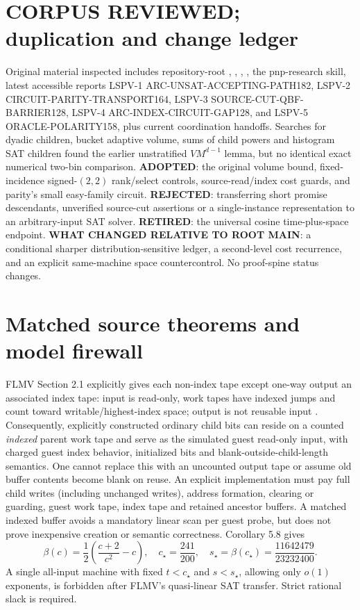 \documentclass[11pt]{article}
\begin{document}
\section{CORPUS REVIEWED; duplication and change ledger}
Original material inspected includes repository-root , , , , the pnp-research skill, latest accessible reports LSPV-1 ARC-UNSAT-ACCEPTING-PATH182, LSPV-2 CIRCUIT-PARITY-TRANSPORT164, LSPV-3 SOURCE-CUT-QBF-BARRIER128, LSPV-4 ARC-INDEX-CIRCUIT-GAP128, and LSPV-5 ORACLE-POLARITY158, plus current coordination handoffs. Searches for dyadic children, bucket adaptive volume, sums of child powers and histogram SAT children found the earlier unstratified $VM^{d-1}$ lemma, but no identical exact numerical two-bin comparison.
\textbf{ADOPTED}: the original volume bound, fixed-incidence signed-$(2,2)$ rank/select controls, source-read/index cost guards, and parity's small easy-family circuit. \textbf{REJECTED}: transferring short promise descendants, unverified source-cut assertions or a single-instance representation to an arbitrary-input SAT solver. \textbf{RETIRED}: the universal cosine time-plus-space endpoint. \textbf{WHAT CHANGED RELATIVE TO ROOT MAIN}: a conditional sharper distribution-sensitive ledger, a second-level cost recurrence, and an explicit same-machine space countercontrol. No proof-spine status changes.

\section{Matched source theorems and model firewall}
FLMV Section 2.1 explicitly gives each non-index tape except one-way output an associated index tape: input is read-only, work tapes have indexed jumps and count toward writable/highest-index space; output is not reusable input \cite{flmv}. Consequently, explicitly constructed ordinary child bits can reside on a counted \emph{indexed} parent work tape and serve as the simulated guest read-only input, with charged guest index behavior, initialized bits and blank-outside-child-length semantics. One cannot replace this with an uncounted output tape or assume old buffer contents become blank on reuse. An explicit implementation must pay full child writes (including unchanged writes), address formation, clearing or guarding, guest work tape, index tape and retained ancestor buffers. A matched indexed buffer avoids a mandatory linear scan per guest probe, but does not prove inexpensive creation or semantic correctness.
Corollary 5.8 gives
\[
\beta(c)=\frac12\left(\frac{c+2}{c^2}-c\right),\quad
c_\star=\frac{241}{200},\quad
s_\star=\beta(c_\star)=\frac{11642479}{23232400}.
\]
A single all-input machine with fixed $t<c_\star$ and $s<s_\star$, allowing only $o(1)$ exponents, is forbidden after FLMV's quasi-linear SAT transfer. Strict rational slack is required.
\end{document}

